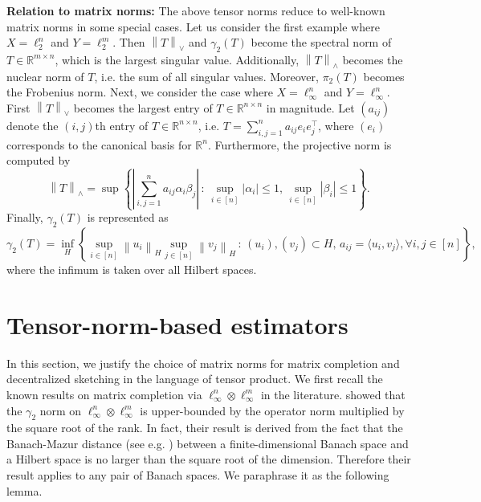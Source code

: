 \documentclass[11pt]{article}
\newcommand{\norm}[1]{\left \|#1 \right \|}
\begin{document}
\noindent\textbf{Relation to matrix norms: } The above tensor norms reduce to well-known matrix norms in some special cases. 
Let us consider the first example where $X = \ell_2^n$ and $Y = \ell_2^m$. 
Then $\norm{T}_\vee$ and $\gamma_2(T)$ become the spectral norm of $T \in \mathbb{R}^{m \times n}$, which is the largest singular value. 
Additionally, $\norm{T}_\wedge$ becomes the nuclear norm of $T$, i.e. the sum of all singular values. Moreover, $\pi_2(T)$ becomes the Frobenius norm. 
Next, we consider the case where $X = \ell_\infty^n$ and $Y = \ell_\infty^n$. 
First $\norm{T}_\vee$ becomes the largest entry of $T \in \mathbb{R}^{n \times n}$ in magnitude. 
Let $(a_{ij})$ denote the $(i,j)$th entry of $T \in \mathbb{R}^{n \times n}$, i.e. $T = \sum_{i,j=1}^n a_{ij} e_i e_j^\top$, where $(e_i)$ corresponds to the canonical basis for $\mathbb{R}^n$. 
Furthermore, the projective norm is computed by
\begin{equation}
\label{eq:projnorm_infinf}
\norm{T}_\wedge = \sup \left\{ \left| \sum_{i,j=1}^n a_{ij} \alpha_i \beta_j \right| \,:\, \sup_{i \in [n]} |\alpha_i| \leq 1, \, \sup_{i \in [n]} |\beta_i| \leq 1 \right\}.
\end{equation}
Finally, $\gamma_2(T)$ is represented as 
\begin{equation}
\label{eq:gamma2_infinf_littlgGT}
\gamma_2(T) = \inf_{H} \left\{ \sup_{i \in [n]} \norm{u_i}_H \sup_{j \in [n]} \norm{v_j}_H \,:\, (u_i), (v_j) \subset H, \, a_{ij} = \langle u_i, v_j \rangle, \forall i,j \in [n] \right\},
\end{equation}
where the infimum is taken over all Hilbert spaces.

\section{Tensor-norm-based estimators}
\label{sec:estimators}

In this section, we justify the choice of matrix norms for matrix completion and decentralized sketching in the language of tensor product.
We first recall the known results on matrix completion via $\ell_\infty^n \otimes \ell_\infty^m$ in the literature. \citet{linial2007complexity} showed that the $\gamma_2$ norm on $\ell_\infty^n \otimes \ell_\infty^m$ is upper-bounded by the operator norm multiplied by the square root of the rank. In fact, their result is derived from the fact that the Banach-Mazur distance (see e.g. \citep{pisier1999volume})  between a finite-dimensional Banach space and a Hilbert space is no larger than the square root of the dimension. 
Therefore their result \cite[Lemma~4.2]{linial2007complexity} applies to any pair of Banach spaces. 
We paraphrase it as the following lemma. 
\end{document}

